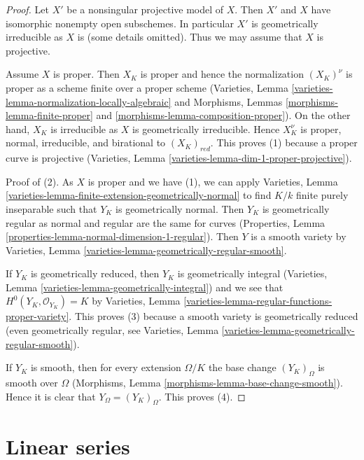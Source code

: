 \begin{proof}
Let $X'$ be a nonsingular projective model of $X$. Then $X'$ and
$X$ have isomorphic nonempty open subschemes. In particular
$X'$ is geometrically irreducible as $X$ is (some details omitted).
Thus we may assume that $X$ is projective.

\medskip\noindent
Assume $X$ is proper. Then $X_K$ is proper and hence the normalization
$(X_K)^\nu$ is proper as a scheme finite over a proper scheme
(Varieties, Lemma \ref{varieties-lemma-normalization-locally-algebraic}
and Morphisms, Lemmas \ref{morphisms-lemma-finite-proper} and
\ref{morphisms-lemma-composition-proper}).
On the other hand, $X_K$ is irreducible as $X$ is geometrically
irreducible. Hence $X_K^\nu$ is proper, normal, irreducible, and birational
to $(X_K)_{red}$. This proves (1) because a proper curve is projective
(Varieties, Lemma \ref{varieties-lemma-dim-1-proper-projective}).

\medskip\noindent
Proof of (2). As $X$ is proper and we have (1), we can apply
Varieties, Lemma \ref{varieties-lemma-finite-extension-geometrically-normal}
to find $K/k$ finite purely inseparable such that
$Y_K$ is geometrically normal. Then $Y_K$ is geometrically regular
as normal and regular are the same for curves
(Properties, Lemma \ref{properties-lemma-normal-dimension-1-regular}).
Then $Y$ is a smooth variety by
Varieties, Lemma \ref{varieties-lemma-geometrically-regular-smooth}.

\medskip\noindent
If $Y_K$ is geometrically reduced, then $Y_K$ is geometrically
integral (Varieties, Lemma \ref{varieties-lemma-geometrically-integral})
and we see that $H^0(Y_K, \mathcal{O}_{Y_K}) = K$ by
Varieties, Lemma \ref{varieties-lemma-regular-functions-proper-variety}.
This proves (3) because a smooth variety is geometrically reduced
(even geometrically regular, see
Varieties, Lemma \ref{varieties-lemma-geometrically-regular-smooth}).

\medskip\noindent
If $Y_K$ is smooth, then for every extension $\Omega/K$
the base change $(Y_K)_\Omega$ is smooth over $\Omega$
(Morphisms, Lemma \ref{morphisms-lemma-base-change-smooth}).
Hence it is clear that $Y_\Omega = (Y_K)_\Omega$. This proves (4).
\end{proof}






\section{Linear series}
\label{section-linear-series}

